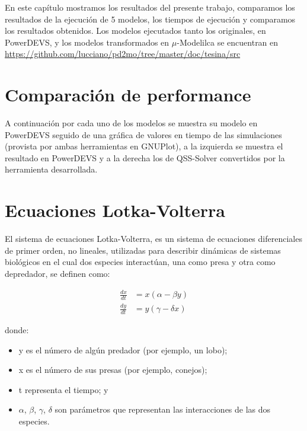 	En este capítulo mostramos los resultados del presente trabajo, comparamos los resultados de la ejecución de 5 modelos, los tiempos de ejecución y 
		comparamos los resultados obtenidos. Los modelos ejecutados tanto los originales, en PowerDEVS, y los modelos transformados en 
		$\mu$-Modelilca se encuentran en \url{https://github.com/lucciano/pd2mo/tree/master/doc/tesina/src}

\section{Comparación de performance}
	A continuación por cada uno de los modelos se muestra su modelo en PowerDEVS seguido de una gráfica de valores en tiempo de las simulaciones 
	(provista por ambas herramientas en GNUPlot), 
	a la izquierda se muestra el resultado en PowerDEVS y a la derecha los de QSS-Solver convertidos por la herramienta desarrollada.


\section{Ecuaciones Lotka-Volterra}

	El sistema de ecuaciones Lotka-Volterra, es un sistema de ecuaciones diferenciales de primer orden, no lineales, utilizadas para describir dinámicas de sistemas biológicos en el cual dos especies interactúan, una como presa y otra como depredador, se definen como:

\begin{align*}
\frac{dx}{dt} & = x(\alpha - \beta y)\\
\frac{dy}{dt} & =y(\gamma - \delta  x)
\end{align*}

donde:
\begin{itemize}
	\item y es el número de algún predador (por ejemplo, un lobo);
    \item x es el número de sus presas (por ejemplo, conejos);
    \item t representa el tiempo; y
    \item $\alpha$, $\beta$, $\gamma$, $\delta$ son parámetros que representan las interacciones de las dos especies.
\end{itemize}

